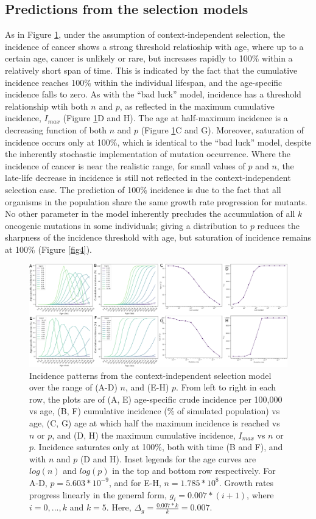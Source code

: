 \documentclass[12pt,onecolumn,twoside]{article}
\begin{document}
\subsection{Predictions from the selection models}
As in Figure \ref{fig3}, under the assumption of context-independent selection, the incidence of cancer shows a strong threshold relatioship with age, where up to a certain age, cancer is unlikely or rare, but increases rapidly to 100\% within a relatively short span of time. This is indicated by the fact that the cumulative incidence reaches 100\% within the individual lifespan, and the age-specific incidence falls to zero. As with the ``bad luck'' model, incidence has a threshold relationship wtih both $n$ and $p$, as reflected in the maximum cumulative incidence, $I_{max}$ (Figure \ref{fig3}D and H). The age at half-maximum incidence is a decreasing function of both $n$ and $p$ (Figure \ref{fig3}C and G). Moreover, saturation of incidence occurs only at 100\%, which is identical to the ``bad luck'' model, despite the inherently stochastic implementation of mutation occurrence. Where the incidence of cancer is near the realistic range, for small values of $p$ and $n$, the late-life decrease in incidence is still not reflected in the context-independent selection case. The prediction of 100\% incidence is due to the fact that all organisms in the population share the same growth rate progression for mutants. No other parameter in the model inherently precludes the accumulation of all $k$ oncogenic mutations in some individuals; giving a distribution to $p$ reduces the sharpness of the incidence threshold with age, but saturation of incidence remains at 100\% (Figure \ref{fig4}).

\begin{figure}[!ht]
	\centering
	\includegraphics[width=\linewidth]{fig3.png}
	\caption{Incidence patterns from the context-independent selection model over the range of (A-D) $n$, and (E-H) $p$. From left to right in each row, the plots are of (A, E) age-specific crude incidence per 100,000 vs age, (B, F) cumulative incidence (\% of simulated population) vs age, (C, G) age at which half the maximum incidence is reached vs $n$ or $p$, and (D, H) the maximum cumulative incidence, $I_{max}$ vs $n$ or $p$. Incidence saturates only at 100\%, both with time (B and F), and with $n$ and $p$ (D and H). Inset legends for the age curves are $log(n)$ and $log(p)$ in the top and bottom row respectively. For A-D, $p=5.603*10^{-9}$, and for E-H, $n=1.785*10^{8}$. Growth rates progress linearly in the general form, $g_{i}=0.007*(i+1)$, where $i=0,...,k$ and $k=5$. Here, $\Delta_{g}=\frac{0.007*k}{k}=0.007$.}
	\label{fig3}
\end{figure}
\end{document}
